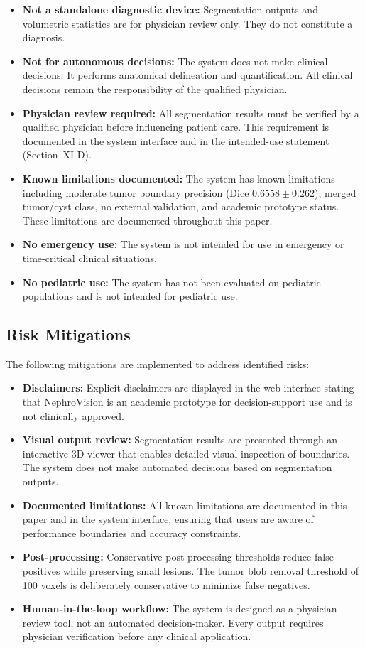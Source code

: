 \begin{itemize}
    \item \textbf{Not a standalone diagnostic device:} Segmentation outputs and volumetric statistics are for physician review only. They do not constitute a diagnosis.
    \item \textbf{Not for autonomous decisions:} The system does not make clinical decisions. It performs anatomical delineation and quantification. All clinical decisions remain the responsibility of the qualified physician.
    \item \textbf{Physician review required:} All segmentation results must be verified by a qualified physician before influencing patient care. This requirement is documented in the system interface and in the intended-use statement (Section~XI-D).
    \item \textbf{Known limitations documented:} The system has known limitations including moderate tumor boundary precision (Dice $0.6558 \pm 0.262$), merged tumor/cyst class, no external validation, and academic prototype status. These limitations are documented throughout this paper.
    \item \textbf{No emergency use:} The system is not intended for use in emergency or time-critical clinical situations.
    \item \textbf{No pediatric use:} The system has not been evaluated on pediatric populations and is not intended for pediatric use.
\end{itemize}

\subsection{Risk Mitigations}

The following mitigations are implemented to address identified risks:

\begin{itemize}
    \item \textbf{Disclaimers:} Explicit disclaimers are displayed in the web interface stating that NephroVision is an academic prototype for decision-support use and is not clinically approved.
    \item \textbf{Visual output review:} Segmentation results are presented through an interactive 3D viewer that enables detailed visual inspection of boundaries. The system does not make automated decisions based on segmentation outputs.
    \item \textbf{Documented limitations:} All known limitations are documented in this paper and in the system interface, ensuring that users are aware of performance boundaries and accuracy constraints.
    \item \textbf{Post-processing:} Conservative post-processing thresholds reduce false positives while preserving small lesions. The tumor blob removal threshold of 100 voxels is deliberately conservative to minimize false negatives.
    \item \textbf{Human-in-the-loop workflow:} The system is designed as a physician-review tool, not an automated decision-maker. Every output requires physician verification before any clinical application.
\end{itemize}

